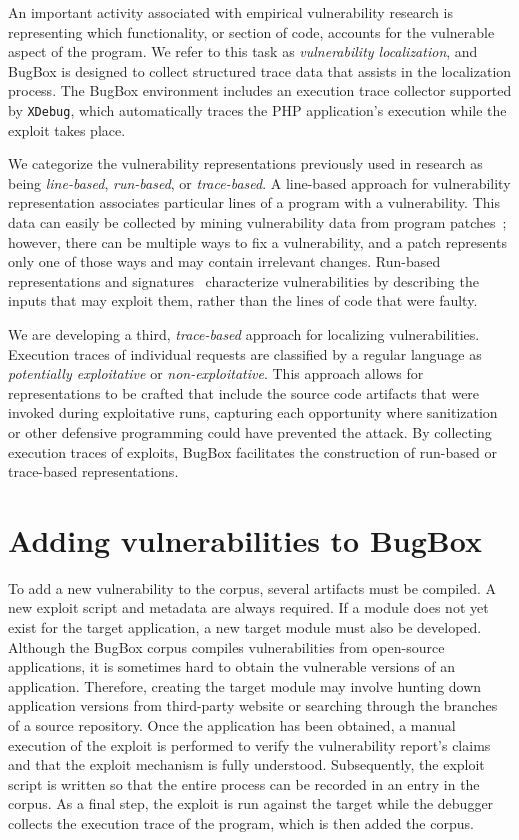 \documentclass[letterpaper,twocolumn,10pt]{article}
\begin{document}
An important activity associated with empirical vulnerability research is representing which functionality, or section of code, accounts for the vulnerable aspect of the program. We refer to this task as \emph{vulnerability localization}, and BugBox is designed to collect structured trace data that assists in the localization process. The BugBox environment includes an execution trace collector supported by \texttt{XDebug}, which automatically traces the PHP application's execution while the exploit takes place.

We categorize the vulnerability representations previously used in research as being \textit{line-based}, \textit{run-based}, or \textit{trace-based}. A line-based approach for vulnerability representation associates particular lines of a program with a vulnerability. This data can easily be collected by mining vulnerability data from program patches~\cite{4630094}; however, there can be multiple ways to fix a vulnerability, and a patch represents only one of those ways and may contain irrelevant changes.  Run-based representations and signatures~\cite{Song:2008:BNA:1496255.1496257} characterize vulnerabilities by describing the inputs that may exploit them, rather than the lines of code that were faulty.

We are developing a third, \textit{trace-based} approach for localizing vulnerabilities. Execution traces of individual requests are classified by a regular language as \emph{potentially exploitative} or \emph{non-exploitative}. This approach allows for representations to be crafted that include the source code artifacts that were invoked during exploitative runs, capturing each opportunity where sanitization or other defensive programming could have prevented the attack. By collecting execution traces of exploits, BugBox facilitates the construction of run-based or trace-based representations.


\section{Adding vulnerabilities to BugBox}

To add a new vulnerability to the corpus, several artifacts must be compiled. A new exploit script and metadata are always required. If a module does not yet exist for the target application, a new target module must also be developed.  Although the BugBox corpus compiles vulnerabilities from open-source applications, it is sometimes hard to obtain the vulnerable versions of an application. Therefore, creating the target module may involve hunting down application versions from third-party website or searching through the branches of a source repository. Once the application has been obtained, a manual execution of the exploit is performed to verify the vulnerability report's claims and that the exploit mechanism is fully understood. Subsequently, the exploit script is written so that the entire process can be recorded in an entry in the corpus. As a final step, the exploit is run against the target while the debugger collects the execution trace of the program, which is then added the corpus.\par
\end{document}
